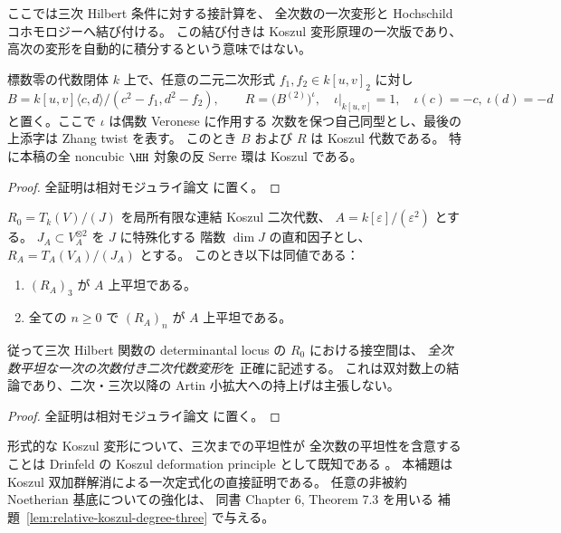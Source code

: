ここでは三次 Hilbert 条件に対する接計算を、
全次数の一次変形と Hochschild コホモロジーへ結び付ける。
この結び付きは Koszul 変形原理の一次版であり、
高次の変形を自動的に積分するという意味ではない。

\begin{proposition}
\label{prop:noncubic-antiserre-koszul}
標数零の代数閉体 $k$ 上で、任意の二元二次形式
$f_1,f_2\in k[u,v]_2$ に対し
\[
 B=k[u,v]\langle c,d\rangle/(c^2-f_1,d^2-f_2),
 \qquad
 R=\bigl(B^{(2)}\bigr)^\iota,\quad
 \iota|_{k[u,v]}=1,\quad \iota(c)=-c,\ \iota(d)=-d
\]
と置く。ここで $\iota$ は偶数 Veronese に作用する
次数を保つ自己同型とし、最後の上添字は Zhang twist を表す。
このとき $B$ および $R$ は Koszul 代数である。
特に本稿の全 noncubic $\HH$ 対象の反 Serre 環は Koszul である。
\end{proposition}
\begin{proof}
全証明は相対モジュライ論文 \cite[\texttt{noncubic_stack}]{QuadricModuli2026} に置く。
\end{proof}

\begin{lemma}
\label{lem:koszul-first-order-degree-three}
$R_0=T_k(V)/(J)$ を局所有限な連結 Koszul 二次代数、
$A=k[\varepsilon]/(\varepsilon^2)$ とする。
$J_A\subset V_A^{\otimes2}$ を $J$ に特殊化する
階数 $\dim J$ の直和因子とし、
$R_A=T_A(V_A)/(J_A)$ とする。
このとき以下は同値である：
\begin{enumerate}
\item $(R_A)_3$ が $A$ 上平坦である。
\item 全ての $n\ge0$ で $(R_A)_n$ が $A$ 上平坦である。
\end{enumerate}
従って三次 Hilbert 関数の determinantal locus の
$R_0$ における接空間は、
\emph{全次数平坦な一次の次数付き二次代数変形}を
正確に記述する。
これは双対数上の結論であり、二次・三次以降の
Artin 小拡大への持上げは主張しない。
\end{lemma}
\begin{proof}
全証明は相対モジュライ論文 \cite[\texttt{noncubic_stack}]{QuadricModuli2026} に置く。
\end{proof}

\begin{remark}
形式的な Koszul 変形について、三次までの平坦性が
全次数の平坦性を含意することは Drinfeld の
Koszul deformation principle として既知である
\cite[Chapter 6, Theorem 2.1 と同章導入]{PolishchukPositselski2005}。
本補題は Koszul 双加群解消による一次定式化の直接証明である。
任意の非被約 Noetherian 基底についての強化は、
同書 Chapter 6, Theorem 7.3 を用いる
補題~\ref{lem:relative-koszul-degree-three} で与える。
\end{remark}

